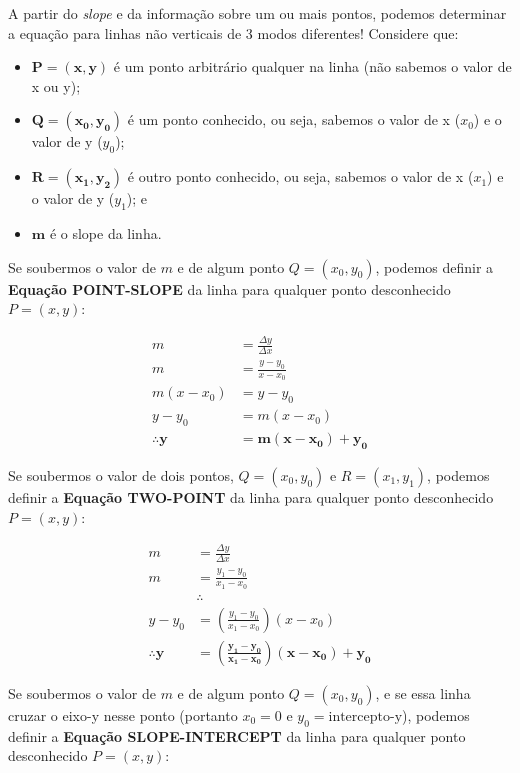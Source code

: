 \documentclass[pdftex, brazil, 12pt, twoside]{article}
\begin{document}
A partir do \emph{slope} e da informação sobre um ou mais pontos,
podemos determinar a equação para linhas não verticais de 3 modos diferentes! Considere que:

\begin{itemize}
\item $\bm{P=(x,y)}$ é um ponto arbitrário qualquer na linha (não sabemos o valor de x ou y);
\item $\bm{Q=(x_0, y_0)}$ é um ponto conhecido, ou seja, sabemos o valor de x ($x_0$) e o valor de y ($y_0$);
\item $\bm{R=(x_1,y_2)}$ é outro ponto conhecido, ou seja, sabemos o valor de x ($x_1$) e o valor de y ($y_1$); e
\item $\bm{m}$ é o slope da linha.
\end{itemize}

Se soubermos o valor de $m$ e de algum ponto $Q=(x_0, y_0)$, podemos definir a
\textbf{Equação POINT-SLOPE} da linha para qualquer ponto desconhecido $P=(x,y)$:

\begin{equation}
  \begin{split}
    m & = \frac{\Delta y}{\Delta x}\\
    m & = \frac{y - y_0}{x - x_0}\\
    m(x - x_0) & = y - y_0\\
    y - y_0 & = m(x - x_0)\\
    \bm{\therefore y} & \bm{= m(x-x_0) + y_0}
  \end{split}
\end{equation}

Se soubermos o valor de dois pontos, $Q=(x_0, y_0)$ e $R=(x_1, y_1)$, podemos definir
a \textbf{Equação TWO-POINT} da linha para qualquer ponto desconhecido $P=(x, y)$:

\begin{equation}
  \begin{split}
    m & = \frac{\Delta y}{\Delta x}\\
    m & = \frac{y_1 - y_0}{x_1 - x_0}\\
      & \therefore\\
    y - y_0 & = \left(\frac{y_1 - y_0}{x_1 - x_0}\right)(x - x_0)\\
    \bm{\therefore y} & \bm{= \left(\frac{y_1 - y_0}{x_1 - x_0}\right)(x-x_0) + y_0}
  \end{split}
\end{equation}

Se soubermos o valor de $m$ e de algum ponto $Q=(x_0, y_0)$, e se essa linha cruzar
o eixo-y nesse ponto (portanto $x_0 = 0$ e $y_0 = \text{intercepto-y}$), podemos definir a
\textbf{Equação SLOPE-INTERCEPT} da linha para qualquer ponto
desconhecido $P=(x, y)$:
\end{document}
